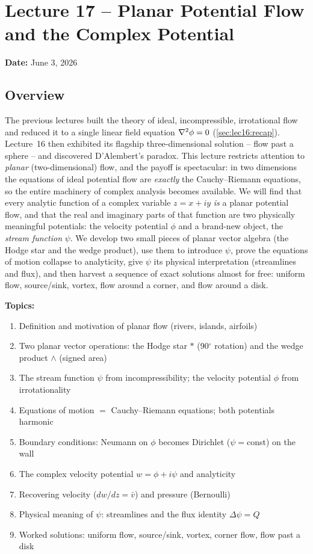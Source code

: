 \documentclass[../main.tex]{subfiles}
\begin{document}
\section{Lecture 17 -- Planar Potential Flow and the Complex Potential}\label{sec:lec17}
\begin{center}
  \textbf{Date:} June 3, 2026
\end{center}

\subsection*{Overview}
The previous lectures built the theory of ideal, incompressible, irrotational flow and reduced it to a single linear field equation $\nabla^2\phi=0$ (\cref{sec:lec16:recap}). Lecture~16 then exhibited its flagship three-dimensional solution -- flow past a sphere -- and discovered D'Alembert's paradox. This lecture restricts attention to \emph{planar} (two-dimensional) flow, and the payoff is spectacular: in two dimensions the equations of ideal potential flow are \emph{exactly} the Cauchy--Riemann equations, so the entire machinery of complex analysis becomes available. We will find that every analytic function of a complex variable $z=x+iy$ \emph{is} a planar potential flow, and that the real and imaginary parts of that function are two physically meaningful potentials: the velocity potential $\phi$ and a brand-new object, the \emph{stream function} $\psi$. We develop two small pieces of planar vector algebra (the Hodge star and the wedge product), use them to introduce $\psi$, prove the equations of motion collapse to analyticity, give $\psi$ its physical interpretation (streamlines and flux), and then harvest a sequence of exact solutions almost for free: uniform flow, source/sink, vortex, flow around a corner, and flow around a disk.

\medskip\noindent\textbf{Topics:}
\begin{enumerate}
  \item Definition and motivation of planar flow (rivers, islands, airfoils)
  \item Two planar vector operations: the Hodge star $\ast$ (90$^\circ$ rotation) and the wedge product $\wedge$ (signed area)
  \item The stream function $\psi$ from incompressibility; the velocity potential $\phi$ from irrotationality
  \item Equations of motion $=$ Cauchy--Riemann equations; both potentials harmonic
  \item Boundary conditions: Neumann on $\phi$ becomes Dirichlet ($\psi=$const) on the wall
  \item The complex velocity potential $w=\phi+i\psi$ and analyticity
  \item Recovering velocity ($dw/dz=\bar v$) and pressure (Bernoulli)
  \item Physical meaning of $\psi$: streamlines and the flux identity $\Delta\psi=Q$
  \item Worked solutions: uniform flow, source/sink, vortex, corner flow, flow past a disk
\end{enumerate}
\end{document}

